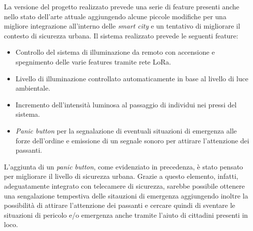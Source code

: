 \documentclass{article}
\begin{document}
	\noindent La versione del progetto realizzato prevede una serie di feature presenti anche nello stato dell'arte attuale aggiungendo alcune piccole modifiche per una migliore integrazione all'interno delle \textit{smart city} e un tentativo di migliorare il contesto di sicurezza urbana.
	Il sistema realizzato prevede le seguenti feature:
	\begin{itemize}
		\item Controllo del sistema di illuminazione da remoto con accensione e spegnimento delle varie features tramite rete LoRa.
		\item Livello di illuminazione controllato automaticamente in base al livello di luce ambientale.
		\item Incremento dell'intensit\`a luminosa al passaggio di individui nei pressi del sistema.
		\item \textit{Panic button} per la segnalazione di eventuali situazioni di emergenza alle forze dell'ordine e emissione di un segnale sonoro per attirare l'attenzione dei passanti.
	\end{itemize}
	L'aggiunta di un \textit{panic button}, come evidenziato in precedenza, \`e stato pensato per migliorare il livello di sicurezza urbana. Grazie a questo elemento, infatti, adeguatamente integrato con telecamere di sicurezza, sarebbe possibile ottenere
	una sengalazione tempestiva delle sitauzioni di emergenza aggiungendo inoltre la possibilit\`a di attirare l'attenzione dei
	passanti e cercare quindi di sventare le situazioni di pericolo e/o emergenza anche tramite l'aiuto di cittadini presenti in loco.
	
\end{document}
